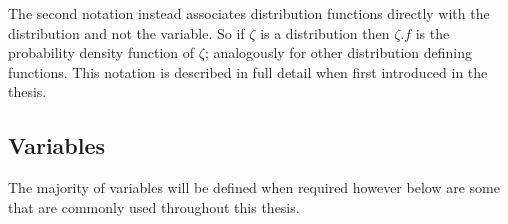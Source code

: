 \documentclass[
  letterpaper,
]{scrbook}
\theoremstyle{plain}
\theoremstyle{definition}
\theoremstyle{remark}
\begin{document}
The second notation instead associates distribution functions directly
with the distribution and not the variable. So if \(\zeta\) is a
distribution then \(\zeta.f\) is the probability density function of
\(\zeta\); analogously for other distribution defining functions. This
notation is described in full detail when first introduced in the
thesis.

\hypertarget{variables}{%
\subsection*{Variables}\label{variables}}

The majority of variables will be defined when required however below
are some that are commonly used throughout this thesis.
\end{document}
